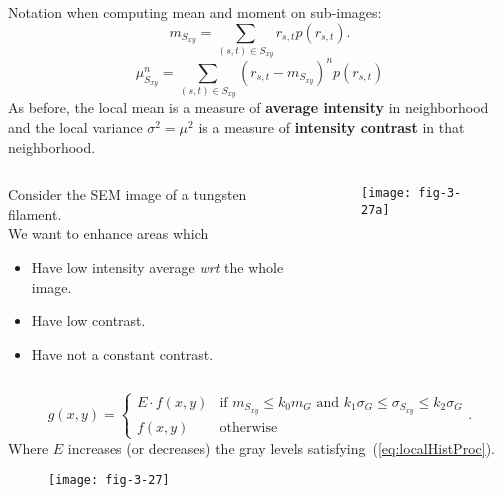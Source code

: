 
\begin{frame}
Notation when computing mean and moment on sub-images:
\begin{equation}
m_{S_{xy}} = \sum_{(s,t) \in S_{xy}} r_{s,t} p(r_{s,t}).
\end{equation}
\begin{equation}
\mu^{n}_{S_{xy}} = \sum_{(s,t)\in S_{xy}} \left ( r_{s,t} - m_{S_{xy}} \right )^{n} p\left ( r_{s,t} \right )
\end{equation}
As before, the local mean is a measure of \textbf{average intensity} in neighborhood and the local variance $\sigma^{2} = \mu^{2}$ is a measure of \textbf{intensity contrast} in that neighborhood.
\end{frame}


\begin{frame}
\begin{columns}
\begin{column}{.5\textwidth}
Consider the SEM image of a tungsten filament.\\
We want to enhance areas which
\begin{itemize}
\item Have low intensity average \textit{wrt} the whole image.
\item Have low contrast.
\item Have not a constant contrast.
\end{itemize}
\end{column}
\begin{column}{.5\textwidth}
\begin{figure}
\centering
\texttt{[image: fig-3-27a]}
\end{figure}
\end{column}
\end{columns}
\end{frame}


\begin{frame}
\begin{equation}
g(x,y) = \left \{
\begin{array}{ll}
E\cdot f(x,y) & \text{if } m_{S_{xy}} \leq k_{0} m_{G} \text{ and } k_{1} \sigma_{G} \leq \sigma_{S_{xy}} \leq  k_{2} \sigma_{G} \\
f(x,y) & \text{otherwise}
\end{array}.
\right .
\label{eq:localHistProc}
\end{equation}
Where $E$ increases (or decreases) the  gray levels satisfying~(\ref{eq:localHistProc}).
\begin{figure}
\centering
\texttt{[image: fig-3-27]}
\end{figure}
\end{frame}

